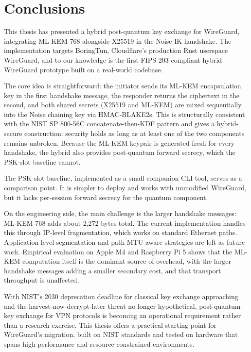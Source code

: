 \chapter{Conclusions}
\label{chap:conclusions}

This thesis has presented a hybrid post-quantum key exchange for WireGuard, integrating ML-KEM-768 alongside X25519 in the Noise IK handshake. The implementation targets BoringTun, Cloudflare's production Rust userspace WireGuard, and to our knowledge is the first FIPS 203-compliant hybrid WireGuard prototype built on a real-world codebase.

The core idea is straightforward: the initiator sends its ML-KEM encapsulation key in the first handshake message, the responder returns the ciphertext in the second, and both shared secrets (X25519 and ML-KEM) are mixed sequentially into the Noise chaining key via HMAC-BLAKE2s. This is structurally consistent with the NIST SP 800-56C concatenate-then-KDF pattern and gives a hybrid-secure construction: security holds as long as at least one of the two components remains unbroken. Because the ML-KEM keypair is generated fresh for every handshake, the hybrid also provides post-quantum forward secrecy, which the PSK-slot baseline cannot.

The PSK-slot baseline, implemented as a small companion CLI tool, serves as a comparison point. It is simpler to deploy and works with unmodified WireGuard, but it lacks per-session forward secrecy for the quantum component.

On the engineering side, the main challenge is the larger handshake messages: ML-KEM-768 adds about 2,272 bytes total. The current implementation handles this through IP-level fragmentation, which works on standard Ethernet paths. Application-level segmentation and path-MTU-aware strategies are left as future work. Empirical evaluation on Apple M4 and Raspberry Pi 5 shows that the ML-KEM computation itself is the dominant source of overhead, with the larger handshake messages adding a smaller secondary cost, and that transport throughput is unaffected.

With NIST's 2030 deprecation deadline for classical key exchange approaching~\cite{nistir8547} and the harvest-now-decrypt-later threat no longer hypothetical, post-quantum key exchange for VPN protocols is becoming an operational requirement rather than a research exercise. This thesis offers a practical starting point for WireGuard's migration, built on NIST standards and tested on hardware that spans high-performance and resource-constrained environments.

